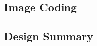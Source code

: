 \documentclass[10pt]{article}
\begin{document}

\subsection{Image Coding}


\subsection{Design Summary}
\end{document}
